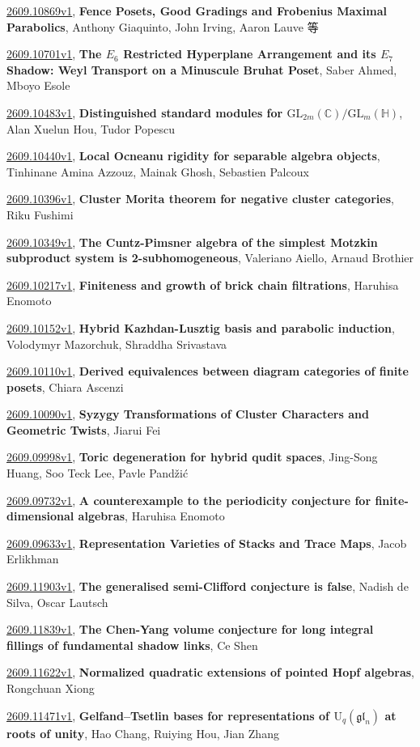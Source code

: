 \documentclass[9pt, a4paper]{article}
\theoremstyle{plain}
\theoremstyle{definition}
\theoremstyle{remark}
\newcommand{\arxiv}[3]{\href{https://arxiv.org/abs/#1}{#1}, \textbf{\textcolor{arxivblue}{#2}}, #3}
\begin{document}
\arxiv{2609.10869v1}{Fence Posets, Good Gradings and Frobenius Maximal Parabolics}{Anthony Giaquinto, John Irving, Aaron Lauve 等}

\arxiv{2609.10701v1}{The $E_6$ Restricted Hyperplane Arrangement and its $E_7$ Shadow: Weyl Transport on a Minuscule Bruhat Poset}{Saber Ahmed, Mboyo Esole}

\arxiv{2609.10483v1}{Distinguished standard modules for $\mathrm{GL}_{2m}(\mathbb{C})/\mathrm{GL}_m(\mathbb{H})$}{Alan Xuelun Hou, Tudor Popescu}

\arxiv{2609.10440v1}{Local Ocneanu rigidity for separable algebra objects}{Tinhinane Amina Azzouz, Mainak Ghosh, Sebastien Palcoux}

\arxiv{2609.10396v1}{Cluster Morita theorem for negative cluster categories}{Riku Fushimi}

\arxiv{2609.10349v1}{The Cuntz-Pimsner algebra of the simplest Motzkin subproduct system is 2-subhomogeneous}{Valeriano Aiello, Arnaud Brothier}

\arxiv{2609.10217v1}{Finiteness and growth of brick chain filtrations}{Haruhisa Enomoto}

\arxiv{2609.10152v1}{Hybrid Kazhdan-Lusztig basis and parabolic induction}{Volodymyr Mazorchuk, Shraddha Srivastava}

\arxiv{2609.10110v1}{Derived equivalences between diagram categories of finite posets}{Chiara Ascenzi}

\arxiv{2609.10090v1}{Syzygy Transformations of Cluster Characters and Geometric Twists}{Jiarui Fei}

\arxiv{2609.09998v1}{Toric degeneration for hybrid qudit spaces}{Jing-Song Huang, Soo Teck Lee, Pavle Pandžić}

\arxiv{2609.09732v1}{A counterexample to the periodicity conjecture for finite-dimensional algebras}{Haruhisa Enomoto}

\arxiv{2609.09633v1}{Representation Varieties of Stacks and Trace Maps}{Jacob Erlikhman}

\arxiv{2609.11903v1}{The generalised semi-Clifford conjecture is false}{Nadish de Silva, Oscar Lautsch}

\arxiv{2609.11839v1}{The Chen-Yang volume conjecture for long integral fillings of fundamental shadow links}{Ce Shen}

\arxiv{2609.11622v1}{Normalized quadratic extensions of pointed Hopf algebras}{Rongchuan Xiong}

\arxiv{2609.11471v1}{Gelfand--Tsetlin bases for representations of $\mathrm U_{q}(\mathfrak{gl}_n)$ at roots of unity}{Hao Chang, Ruiying Hou, Jian Zhang}
\end{document}
